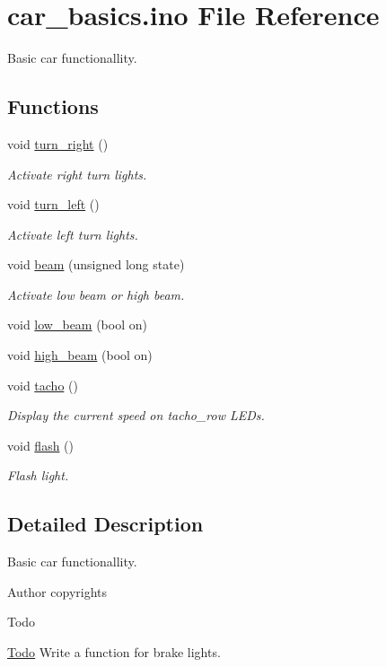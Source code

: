 \hypertarget{car__basics_8ino}{}\section{car\+\_\+basics.\+ino File Reference}
\label{car__basics_8ino}


Basic car functionallity.  


\subsection*{Functions}
{\bf }\par
\begin{DoxyCompactItemize}
\item 
void \hyperlink{group__car_gaca3b725ebee32d3719a9c02b41002ea3}{turn\+\_\+right} ()
\begin{DoxyCompactList}\small\item\em Activate right turn lights. \end{DoxyCompactList}\item 
void \hyperlink{group__car_ga0565ad7a822d9d334bb50c088af22361}{turn\+\_\+left} ()
\begin{DoxyCompactList}\small\item\em Activate left turn lights. \end{DoxyCompactList}\item 
void \hyperlink{group__car_ga6b1fd674445dd1c654dfe8b8b65f168e}{beam} (unsigned long state)
\begin{DoxyCompactList}\small\item\em Activate low beam or high beam. \end{DoxyCompactList}\item 
void \hyperlink{group__car_ga29d5eff542aae0196b8e84b8a752e1df}{low\+\_\+beam} (bool on)
\item 
void \hyperlink{group__car_ga1088d06b4ab015d579e0ac2510d39f25}{high\+\_\+beam} (bool on)
\item 
void \hyperlink{group__car_gac7295d1018b2b948084ba5dbacf09d74}{tacho} ()
\begin{DoxyCompactList}\small\item\em Display the current speed on tacho\+\_\+row L\+E\+Ds. \end{DoxyCompactList}\item 
void \hyperlink{group__car_gaffb7c011f82f3fb47b39ebb2713a1cd8}{flash} ()
\begin{DoxyCompactList}\small\item\em Flash light. \end{DoxyCompactList}\end{DoxyCompactItemize}



\subsection{Detailed Description}
Basic car functionallity. 

\begin{DoxyAuthor}{Author}
copyrights 
\end{DoxyAuthor}
\begin{DoxyRefDesc}{Todo}
\item[\hyperlink{todo__todo000001}{Todo}]Write a function for brake lights. \end{DoxyRefDesc}
